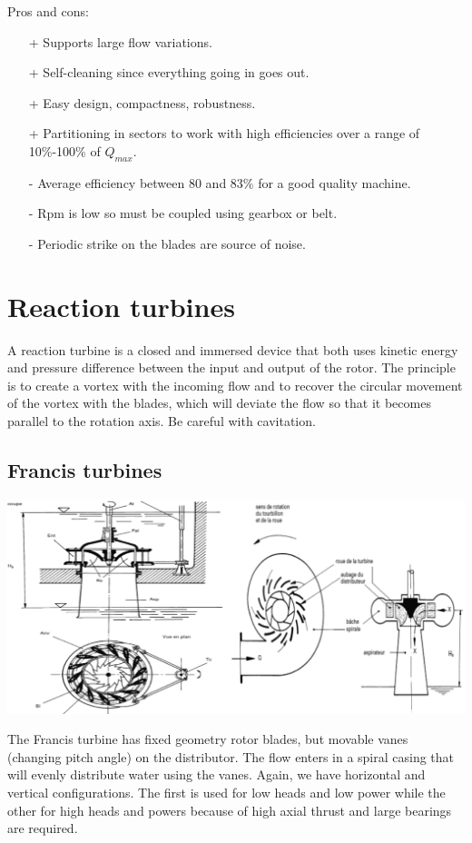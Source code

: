 Pros and cons: 
\begin{itemize}
\item[+] Supports large flow variations.
\item[+] Self-cleaning since everything going in goes out.
\item[+] Easy design, compactness, robustness.
\item[+] Partitioning in sectors to work with high efficiencies over a range of 10\%-100\% of $Q_{max}$. 
\item[-] Average efficiency between 80 and 83\% for a good quality machine.
\item[-] Rpm is low so must be coupled using gearbox or belt.
\item[-] Periodic strike on the blades are source of noise. 
\end{itemize}

\section{Reaction turbines}
A reaction turbine is a closed and immersed device that both uses kinetic energy and pressure difference between the input and output of the rotor. The principle is to create a vortex with the incoming flow and to recover the circular movement of the vortex with the blades, which will deviate the flow so that it becomes parallel to the rotation axis. Be careful with cavitation.  

\subsection{Francis turbines }
\begin{center}
\includegraphics[scale=0.4]{ch4/8}
\end{center}
The Francis turbine has fixed geometry rotor blades, but movable vanes (changing pitch angle) on the distributor. The flow enters in a spiral casing that will evenly distribute water using the vanes. Again, we have horizontal and vertical configurations. The first is used for low heads and low power while the other for high heads and powers because of high axial thrust and large bearings are required.\\

